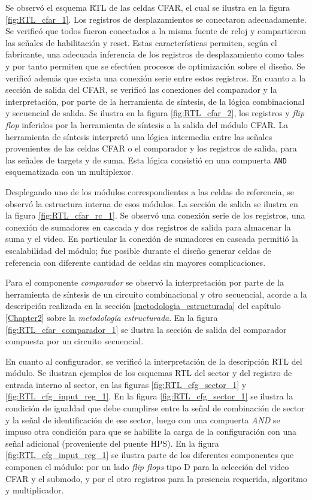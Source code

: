 Se observó el esquema RTL de las celdas CFAR, el cual se ilustra en la figura \ref{fig:RTL_cfar_1}. Los registros de desplazamientos se conectaron adecuadamente. Se verificó que todos fueron conectados a la misma fuente de reloj y compartieron las señales de habilitación y reset. Estas características permiten, según el fabricante, una adecuada inferencia de los registros de desplazamiento como tales y por tanto permiten que se efectúen procesos de optimización sobre el diseño. Se verificó además que exista una conexión serie entre estos registros. En cuanto a la sección de salida del CFAR, se verificó las conexiones del comparador y la interpretación, por parte de la herramienta de síntesis, de la lógica combinacional y secuencial de salida. Se ilustra en la figura \ref{fig:RTL_cfar_2}, los registros y \textit{flip flop} inferidos por la herramienta de síntesis a la salida del módulo CFAR. La herramienta de síntesis interpretó una lógica intermedia entre las señales provenientes de las celdas CFAR o el comparador y los registros de salida, para las señales de targets y de suma. Esta lógica consistió en una compuerta \texttt{AND} esquematizada con un multiplexor.

Desplegando uno de los módulos correspondientes a las celdas de referencia, se observó la estructura interna de esos módulos. La sección de salida se ilustra en la figura \ref{fig:RTL_cfar_rc_1}. Se observó una conexión serie de los registros, una conexión de sumadores en cascada y dos registros de salida para almacenar la suma y el video. En particular la conexión de sumadores en cascada permitió la escalabilidad del módulo; fue posible durante el diseño generar celdas de referencia con diferente cantidad de celdas sin mayores complicaciones.

Para el componente \textit{comparador} se observó la interpretación por parte de la herramienta de síntesis de un circuito combinacional y otro secuencial, acorde a la descripción realizada en la sección \ref{metodologia_estructurada} del capítulo \ref{Chapter2} sobre la \textit{metodología estructurada}. En la figura \ref{fig:RTL_cfar_comparador_1} se ilustra la sección de salida del comparador compuesta por un circuito secuencial.

En cuanto al configurador, se verificó la interpretación de la descripción RTL del módulo. Se ilustran ejemplos de los esquemas RTL del sector y del registro de entrada interno al sector, en las figuras \ref{fig:RTL_cfg_sector_1} y \ref{fig:RTL_cfg_input_reg_1}. En la figura \ref{fig:RTL_cfg_sector_1} se ilustra la condición de igualdad que debe cumplirse entre la señal de combinación de sector y la señal de identificación de ese sector, luego con una compuerta \textit{AND} se impuso otra condición para que se habilite la carga de la configuración con una señal adicional (proveniente del puente HPS). En la figura \ref{fig:RTL_cfg_input_reg_1} se ilustra parte de los diferentes componentes que componen el módulo: por un lado \textit{flip flops} tipo D para la selección del video CFAR y el submodo, y por el otro registros para la presencia requerida, algoritmo y multiplicador.




